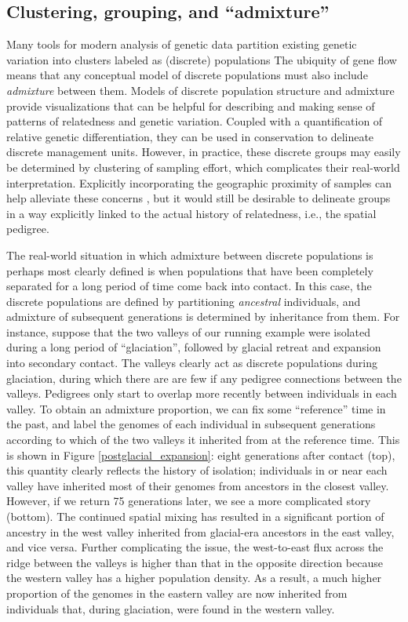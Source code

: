 \documentclass{ar-1col}
\renewcommand{\emph}[1]{{\textit{#1}}}
\begin{document}
\subsection{Clustering, grouping, and ``admixture''}

Many tools for modern analysis of genetic data
partition existing genetic variation into clusters labeled as (discrete) populations
\citep[e.g.,][]{STRUCTURE, ADMIXTURE}
The ubiquity of gene flow means that
any conceptual model of discrete populations 
must also include \emph{admixture} between them.
Models of discrete population structure and admixture 
provide visualizations that can be helpful for
describing and making sense of patterns of relatedness and genetic variation.
Coupled with a quantification of relative genetic differentiation,
they can be used in conservation to delineate discrete management units.
However, in practice, these discrete groups may easily be determined
by clustering of sampling effort,
which complicates their real-world interpretation.
Explicitly incorporating the geographic proximity of samples 
can help alleviate these concerns \citep{spacemix,conStruct},
but it would still be desirable to delineate groups in a way explicitly linked
to the actual history of relatedness, i.e., the spatial pedigree.

The real-world situation in which admixture between discrete populations 
is perhaps most clearly defined is when populations that have been completely separated
for a long period of time come back into contact.
In this case, the discrete populations are defined by partitioning \emph{ancestral} individuals,
and admixture of subsequent generations is determined by inheritance from them.
For instance, suppose that 
the two valleys of our running example
were isolated during a long period of ``glaciation'',
followed by glacial retreat and expansion into secondary contact.
The valleys clearly act as discrete populations during glaciation, 
during which there are are few if any pedigree connections between the valleys.
Pedigrees only start to overlap more recently between individuals in each valley.
To obtain an admixture proportion,
we can fix some ``reference'' time in the past,
and label the genomes of each individual in subsequent generations 
according to which of the two valleys it inherited from at the reference time.
This is shown in Figure \ref{postglacial_expansion}:
eight generations after contact (top),
this quantity clearly reflects the history of isolation;  
individuals in or near each valley have inherited most of their genomes 
from ancestors in the closest valley.
However, if we return 75 generations later, 
we see a more complicated story (bottom).
The continued spatial mixing has resulted in a significant 
portion of ancestry in the west valley inherited from 
glacial-era ancestors in the east valley, 
and vice versa.
Further complicating the issue, 
the west-to-east flux across the ridge between the valleys 
is higher than that in the opposite direction 
because the western valley has a higher population density. 
As a result, a much higher proportion of the genomes
in the eastern valley are now inherited 
from individuals that, 
during glaciation, were found in the western valley.
\end{document}
